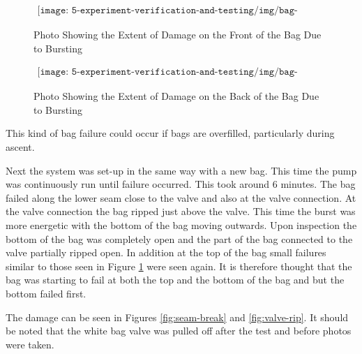 \begin{figure}[H]
    \begin{align*}
        \texttt{[image: 5-experiment-verification-and-testing/img/bag-burst-front.png]}
    \end{align*}
    \caption {Photo Showing the Extent of Damage on the Front of the Bag Due to Bursting} \label{fig:bag-burst-front}
\end{figure}

\begin{figure}[H]
    \begin{align*}
        \texttt{[image: 5-experiment-verification-and-testing/img/bag-burst-back.png]}
    \end{align*}
    \caption {Photo Showing the Extent of Damage on the Back of the Bag Due to Bursting} \label{fig:bag-burst-back}
\end{figure}

This kind of bag failure could occur if bags are overfilled, particularly during ascent.

Next the system was set-up in the same way with a new bag. This time the pump was continuously run until failure occurred. This took around 6 minutes. The bag failed along the lower seam close to the valve and also at the valve connection. At the valve connection the bag ripped just above the valve. This time the burst was more energetic with the bottom of the bag moving outwards. Upon inspection the bottom of the bag was completely open and the part of the bag connected to the valve partially ripped open. In addition at the top of the bag small failures similar to those seen in Figure \ref{fig:bag-burst-front} were seen again. It is therefore thought that the bag was starting to fail at both the top and the bottom of the bag and but the bottom failed first.

The damage can be seen in Figures \ref{fig:seam-break} and \ref{fig:valve-rip}. It should be noted that the white bag valve was pulled off after the test and before photos were taken.

